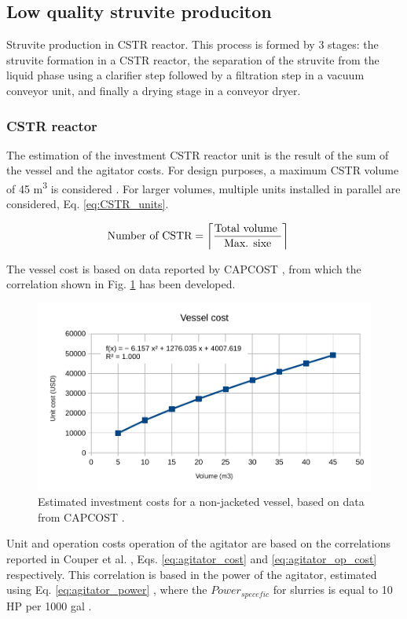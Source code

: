 \documentclass[10pt,a4paper]{article}
\DeclarePairedDelimiter{\ceil}{\lceil}{\rceil}
\begin{document}
\subsection{Low quality struvite produciton}
Struvite production in CSTR reactor. This process is formed by 3 stages: the struvite formation in a CSTR reactor, the separation of the struvite from the liquid phase using a clarifier step followed by a filtration step in a vacuum conveyor unit, and finally a drying stage in a conveyor dryer.

\subsubsection{CSTR reactor}
The estimation of the investment CSTR reactor unit is the result of the sum of the vessel and the agitator costs. For design purposes, a maximum CSTR volume of 45 m\textsuperscript{3} is considered \cite{CAPCOST}. For larger volumes, multiple units installed in parallel are considered, Eq. \ref{eq:CSTR_units}.

\begin{align} \label{eq:CSTR_units}
& \text{Number of CSTR} = \ceil[\bigg]{\frac{\text{Total volume }}{\text{Max. sixe}}}
\end{align}

The vessel cost is based on data reported by CAPCOST \cite{CAPCOST}, from which the correlation shown in Fig. \ref{fig:vessel_investment_cost} has been developed.
\begin{figure}[H]
	\centering
	\includegraphics[width=0.6\linewidth]{vessel_investment_cost} 
	\caption{Estimated investment costs for a non-jacketed vessel, based on data from CAPCOST \cite{CAPCOST}.}
	\label{fig:vessel_investment_cost}
\end{figure}

Unit and operation costs operation of the agitator are based on the correlations reported in Couper et al. \cite{Walas}, Eqs. \ref{eq:agitator_cost} and \ref{eq:agitator_op_cost} respectively. This correlation is based in the power of the agitator, estimated using Eq. \ref{eq:agitator_power} , where the $Power_{specefic}$ for slurries is equal to 10 HP per 1000 gal \cite{Walas}.
\end{document}
